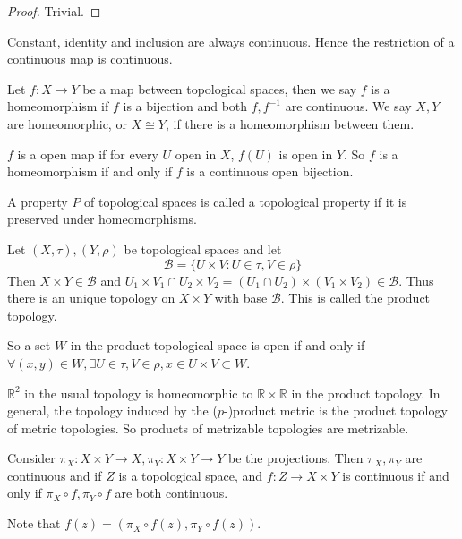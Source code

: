 \begin{proof}
    Trivial.
\end{proof}
\begin{example}
    Constant, identity and inclusion are always continuous.
    Hence the restriction of a continuous map is continuous.
\end{example}
\begin{definition}
    Let $f:X\to Y$ be a map between topological spaces, then we say $f$ is a homeomorphism if $f$ is a bijection and both $f,f^{-1}$ are continuous.
    We say $X,Y$ are homeomorphic, or $X\cong Y$, if there is a homeomorphism between them.
\end{definition}
\begin{definition}
    $f$ is a open map if for every $U$ open in $X$, $f(U)$ is open in $Y$.
    So $f$ is a homeomorphism if and only if $f$ is a continuous open bijection.
\end{definition}
\begin{definition}
    A property $P$ of topological spaces is called a topological property if it is preserved under homeomorphisms.
\end{definition}
\begin{definition}
    Let $(X,\tau),(Y,\rho)$ be topological spaces and let
    $$\mathscr B=\{U\times V:U\in\tau, V\in\rho\}$$
    Then $X\times Y\in\mathscr B$ and $U_1\times V_1\cap U_2\times V_2=(U_1\cap U_2)\times (V_1\times V_2)\in\mathscr B$.
    Thus there is an unique topology on $X\times Y$ with base $\mathscr B$.
    This is called the product topology.
\end{definition}
So a set $W$ in the product topological space is open if and only if $\forall (x,y)\in W,\exists U\in\tau, V\in\rho, x\in U\times V\subset W$.
\begin{example}
    $\mathbb R^2$ in the usual topology is homeomorphic to $\mathbb R\times\mathbb R$ in the product topology.
    In general, the topology induced by the ($p$-)product metric is the product topology of metric topologies.
    So products of metrizable topologies are metrizable.
\end{example}
\begin{proposition}
    Consider $\pi_X:X\times Y\to X,\pi_Y:X\times Y\to Y$ be the projections.
    Then $\pi_X,\pi_Y$ are continuous and if $Z$ is a topological space, and $f:Z\to X\times Y$ is continuous if and only if $\pi_X\circ f,\pi_Y\circ f$ are both continuous.
\end{proposition}
Note that $f(z)=(\pi_X\circ f(z),\pi_Y\circ f(z))$.
